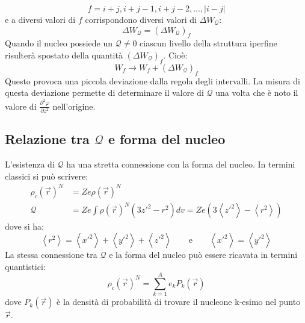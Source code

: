 \begin{equation}
f = i+j, i+j-1, i+j-2, ..., \left| i-j \right| 
\end{equation}
e a diversi valori di $f$ corrispondono diversi valori di $\Delta 
W_{\mathcal{Q}}$:
\begin{equation}
\Delta W_{\mathcal{Q}} = \left( \Delta W_{\mathcal{Q}} \right)_f 
\end{equation}
Quando il nucleo possiede un $\mathcal{Q} \ne 0$ ciascun livello della struttura
iperfine risulterà spostato della quantità $\left( \Delta W_{\mathcal{Q}}
\right)_f$. Cioè:
\begin{equation}
W_f \rightarrow W_f + \left( \Delta W_{\mathcal{Q}} \right)_f
\end{equation}
Questo provoca una piccola deviazione dalla regola degli intervalli. La misura
di questa deviazione permette di determinare il valore di $\mathcal{Q}$ una
volta che è noto il valore di $\frac{\partial^2 \varphi}{\partial z^2}$
nell'origine.

\subsection{Relazione tra $\mathcal{Q}$ e forma del nucleo}
L'esistenza di $\mathcal{Q}$ ha una stretta connessione con la forma del nucleo.
In termini classici si può scrivere:
\begin{equation}
\begin{split}
\rho_c{(\vec{r})}^N &= Z e \rho{(\vec{r})}^N\\
\mathcal{Q} &= Z e \int \rho{(\vec{r})}^N (3z'^2 - r^2) dv = Z e (3 
\left\langle z'^2 \right\rangle - \left\langle r^2 \right\rangle )
\end{split}
\end{equation}
dove si ha:
\begin{equation}
\left\langle r^2 \right\rangle  = \left\langle x'^2 \right\rangle + 
\left\langle y'^2 \right\rangle + \left\langle z'^2 \right\rangle \qquad 
\text{e} \qquad \left\langle x'^2 \right\rangle = \left\langle y'^2 
\right\rangle
\end{equation}
La stessa connessione tra $\mathcal{Q}$ e la forma del nucleo può essere
ricavata in termini quantistici:
\begin{equation}
\rho_c{(\vec{r})}^N = \sum_{k=1}^A e_k P_k{(\vec{r})}
\end{equation}
dove $P_k{(\vec{r})}$ è la densità di probabilità di trovare il nucleone 
k-esimo nel punto $\vec{r}$.

